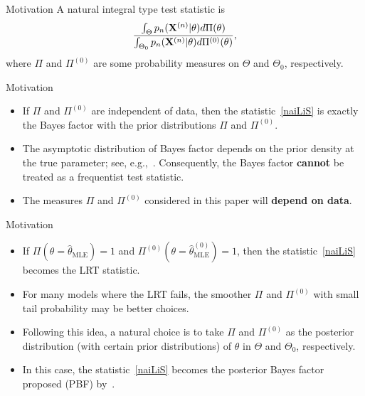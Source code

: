 \documentclass{beamer}
\theoremstyle{plain}
\theoremstyle{definition}
\theoremstyle{remark}
\begin{document}
\begin{frame}{Motivation}
A natural integral type test statistic is
\begin{equation}\label{naiLiS} 
    \frac{\int_{\Theta}p_n(\mathbf{X}^{(n)}|\theta) d\Pi(\theta)}{\int_{\Theta_0} p_n(\mathbf{X}^{(n)}|\theta) d\Pi^{(0)}(\theta)},
\end{equation}
where $\Pi$ and $\Pi^{(0)}$ are some probability measures on $\Theta$ and $\Theta_{0}$, respectively.

\end{frame}
\begin{frame}{Motivation}
    \begin{itemize}
        \item
If $\Pi$ and $\Pi^{(0)}$ are independent of data, then the statistic~\eqref{naiLiS} is exactly the Bayes factor \cite{scientificInference} with the prior distributions $\Pi$ and $\Pi^{(0)}$.
\item
The asymptotic distribution of Bayes factor depends on the prior density at the true parameter; see, e.g.,~\cite{clarke1990information}.
Consequently, the Bayes factor \textbf{cannot} be treated as a frequentist test statistic.
\item
    The measures $\Pi$ and $\Pi^{(0)}$ considered in this paper will \textbf{depend on data}.
\end{itemize}
\end{frame}

\begin{frame}{Motivation}
    \begin{itemize}
        \item 
If $\Pi(\theta=\hat{\theta}_{\text{MLE}})=1$ and $\Pi^{(0)}(\theta=\hat{\theta}^{(0)}_{\text{MLE}})=1$, then the statistic~\eqref{naiLiS} becomes the LRT statistic.
\item
 For many models where the LRT fails, the smoother $\Pi$ and $\Pi^{(0)}$ with small tail probability may be better choices.
 \item
Following this idea, a natural choice is to take $\Pi$ and $\Pi^{(0)}$ as the posterior distribution (with certain prior distributions) of $\theta$ in $\Theta$ and $\Theta_0$, respectively.
\item
In this case, the statistic~\eqref{naiLiS} becomes the posterior Bayes factor proposed (PBF) by~\cite{Aitkin1991Posterior}.
    \end{itemize}

\end{frame}
\end{document}
